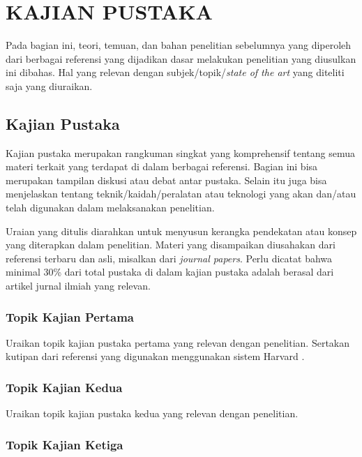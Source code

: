 
\chapter{KAJIAN PUSTAKA}

Pada bagian ini, teori, temuan, dan bahan penelitian sebelumnya yang diperoleh dari berbagai referensi yang dijadikan dasar melakukan penelitian yang diusulkan ini dibahas. Hal yang relevan dengan subjek/topik/\textit{state of the art} yang diteliti saja yang diuraikan.

\section{Kajian Pustaka}

Kajian pustaka merupakan rangkuman singkat yang komprehensif tentang semua materi terkait yang terdapat di dalam berbagai referensi. Bagian ini bisa merupakan tampilan diskusi atau debat antar pustaka. Selain itu juga bisa menjelaskan tentang teknik/kaidah/peralatan atau teknologi yang akan dan/atau telah digunakan dalam melaksanakan penelitian.

Uraian yang ditulis diarahkan untuk menyusun kerangka pendekatan atau konsep yang diterapkan dalam penelitian. Materi yang disampaikan diusahakan dari referensi terbaru dan asli, misalkan dari \textit{journal papers}. Perlu dicatat bahwa minimal 30\% dari total pustaka di dalam kajian pustaka adalah berasal dari artikel jurnal ilmiah yang relevan.

\subsection{Topik Kajian Pertama}

Uraikan topik kajian pustaka pertama yang relevan dengan penelitian. Sertakan kutipan dari referensi yang digunakan menggunakan sistem Harvard \citep{contoh2024}.

\subsection{Topik Kajian Kedua}

Uraikan topik kajian pustaka kedua yang relevan dengan penelitian.

\subsection{Topik Kajian Ketiga}

